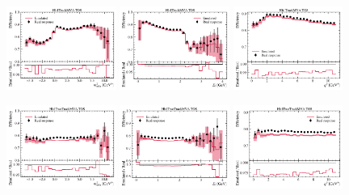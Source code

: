 \begin{figure}[htb]
    \centering
    \includegraphics[width=0.32\textwidth]{
        ./figs-mc-emulation/emulate-hlt1/b_Hlt1TrackMVA_TOS_mmiss2.pdf
    }
    \includegraphics[width=0.32\textwidth]{
        ./figs-mc-emulation/emulate-hlt1/b_Hlt1TrackMVA_TOS_el.pdf
    }
    \includegraphics[width=0.32\textwidth]{
        ./figs-mc-emulation/emulate-hlt1/b_Hlt1TrackMVA_TOS_q2.pdf
    }

    \includegraphics[width=0.32\textwidth]{
        ./figs-mc-emulation/emulate-hlt1/b_Hlt1TwoTrackMVA_TOS_mmiss2.pdf
    }
    \includegraphics[width=0.32\textwidth]{
        ./figs-mc-emulation/emulate-hlt1/b_Hlt1TwoTrackMVA_TOS_el.pdf
    }
    \includegraphics[width=0.32\textwidth]{
        ./figs-mc-emulation/emulate-hlt1/b_Hlt1TwoTrackMVA_TOS_q2.pdf
    }


\end{figure}
